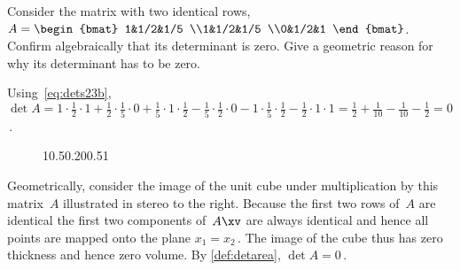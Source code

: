 \begin{example} 
Consider the matrix with two identical rows,
\(A=\begin{bmat} 1&1/2&1/5
\\1&1/2&1/5
\\0&1/2&1 \end{bmat}\).
Confirm algebraically that its determinant is zero.
Give a geometric reason for why its determinant has to be zero.

\begin{solution} 
Using~\eqref{eq:dets23b}, \(\det A =1\cdot\frac12\cdot1 +\frac12\cdot\frac15\cdot0 +\frac15\cdot1\cdot\frac12
-\frac15\cdot\frac12\cdot0 -1\cdot\frac15\cdot\frac12 -\frac12\cdot1\cdot1 =\frac12+\frac1{10}-\frac1{10}-\frac12=0\)\,.

\begin{wrapfigure}{r}{0pt} 
1{0.5}{0.2}{0}{0.5}1
\end{wrapfigure}
Geometrically, consider the image of the unit cube under multiplication by this matrix~\(A\) illustrated in stereo to the right. 
Because the first two rows of~\(A\) are identical the first two components of~\(A\xv\) are always identical and hence all points are mapped onto the plane \(x_1=x_2\)\,.  
The image of the cube thus has zero thickness and hence zero volume.
By \cref{def:detarea}, \(\det A=0\)\,.
\aqed

\end{solution}
\end{example}





